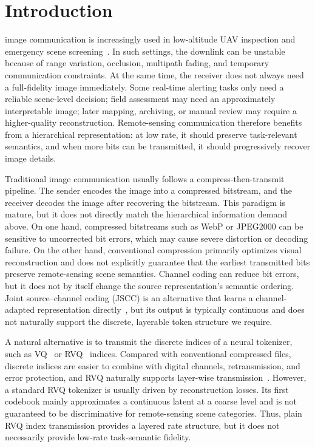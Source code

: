 \documentclass[lettersize,journal]{IEEEtran}
\begin{document}
\section{Introduction}
 image communication is increasingly used in low-altitude UAV inspection and emergency scene screening~\cite{gao2022task}. In such settings, the downlink can be unstable because of range variation, occlusion, multipath fading, and temporary communication constraints. At the same time, the receiver does not always need a full-fidelity image immediately. Some real-time alerting tasks only need a reliable scene-level decision; field assessment may need an approximately interpretable image; later mapping, archiving, or manual review may require a higher-quality reconstruction. Remote-sensing communication therefore benefits from a hierarchical representation: at low rate, it should preserve task-relevant semantics, and when more bits can be transmitted, it should progressively recover image details.

Traditional image communication usually follows a compress-then-transmit pipeline. The sender encodes the image into a compressed bitstream, and the receiver decodes the image after recovering the bitstream. This paradigm is mature, but it does not directly match the hierarchical information demand above. On one hand, compressed bitstreams such as WebP or JPEG2000 can be sensitive to uncorrected bit errors, which may cause severe distortion or decoding failure. On the other hand, conventional compression primarily optimizes visual reconstruction and does not explicitly guarantee that the earliest transmitted bits preserve remote-sensing scene semantics. Channel coding can reduce bit errors, but it does not by itself change the source representation's semantic ordering. Joint source--channel coding (JSCC) is an alternative that learns a channel-adapted representation directly~\cite{deepjscc}, but its output is typically continuous and does not naturally support the discrete, layerable token structure we require.

A natural alternative is to transmit the discrete indices of a neural tokenizer, such as VQ~\cite{vqvae} or RVQ~\cite{lee2022residual} indices. Compared with conventional compressed files, discrete indices are easier to combine with digital channels, retransmission, and error protection, and RVQ naturally supports layer-wise transmission~\cite{moc-rvq}. However, a standard RVQ tokenizer is usually driven by reconstruction losses. Its first codebook mainly approximates a continuous latent at a coarse level and is not guaranteed to be discriminative for remote-sensing scene categories. Thus, plain RVQ index transmission provides a layered rate structure, but it does not necessarily provide low-rate task-semantic fidelity.
\end{document}
